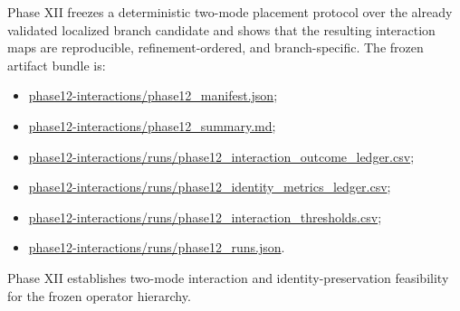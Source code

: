 \documentclass[11pt]{article}
\begin{document}
Phase XII freezes a deterministic two-mode placement protocol over the already validated localized branch candidate and shows that the resulting interaction maps are reproducible, refinement-ordered, and branch-specific. The frozen artifact bundle is:
\begin{itemize}
\item \url{phase12-interactions/phase12_manifest.json};
\item \url{phase12-interactions/phase12_summary.md};
\item \url{phase12-interactions/runs/phase12_interaction_outcome_ledger.csv};
\item \url{phase12-interactions/runs/phase12_identity_metrics_ledger.csv};
\item \url{phase12-interactions/runs/phase12_interaction_thresholds.csv};
\item \url{phase12-interactions/runs/phase12_runs.json}.
\end{itemize}

Phase XII establishes two-mode interaction and identity-preservation feasibility for the frozen operator hierarchy.
\end{document}
